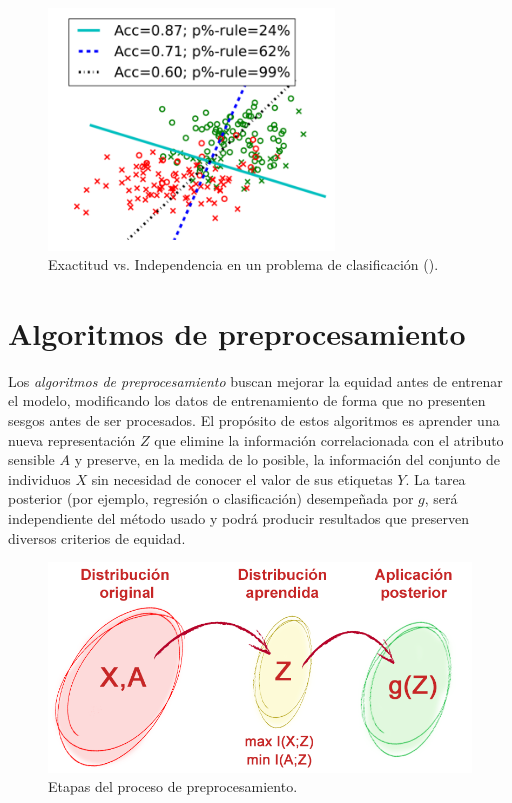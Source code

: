 \documentclass[oneside,openright,titlepage,numbers=noenddot,openany,headinclude,footinclude=true,
cleardoublepage=empty,abstractoff,BCOR=5mm,paper=a4,fontsize=12pt,main=spanish]{scrreprt}
\begin{document}
\begin{figure}[h]
	\centering
	\includegraphics[width=7.6cm]{accuracyeq.png}
	\caption{Exactitud vs. Independencia en un problema de clasificación (\cite{constraints2017}).}
    \label{fig:tradeoff}
\end{figure}

\section{Algoritmos de preprocesamiento}

Los \textit{algoritmos de preprocesamiento} buscan mejorar la equidad antes de entrenar el modelo, modificando los datos de entrenamiento de forma que no presenten sesgos antes de ser procesados. El propósito de estos algoritmos es aprender una nueva representación $Z$ que elimine la información correlacionada con el atributo sensible $A$ y preserve, en la medida de lo posible, la información del conjunto de individuos $X$ sin necesidad de conocer el valor de sus etiquetas $Y$. La tarea posterior (por ejemplo, regresión o clasificación) desempeñada por $g$, será independiente del método usado y podrá producir resultados que preserven diversos criterios de equidad.\\

\begin{figure}[h]
	\centering
	\includegraphics[width=12.1cm]{preprocesado.png}
	\caption{Etapas del proceso de preprocesamiento.}
    \label{fig:preprocessing}
\end{figure}
\end{document}
